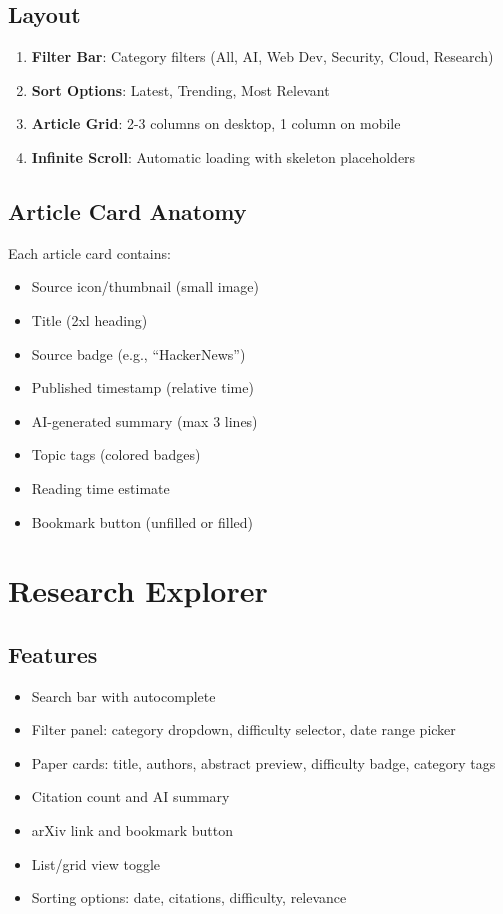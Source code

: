 \documentclass{report}
\begin{document}
\subsection{Layout}

\begin{enumerate}
    \item \textbf{Filter Bar}: Category filters (All, AI, Web Dev, Security, Cloud, Research)
    \item \textbf{Sort Options}: Latest, Trending, Most Relevant
    \item \textbf{Article Grid}: 2-3 columns on desktop, 1 column on mobile
    \item \textbf{Infinite Scroll}: Automatic loading with skeleton placeholders
\end{enumerate}

\subsection{Article Card Anatomy}

Each article card contains:
\begin{itemize}
    \item Source icon/thumbnail (small image)
    \item Title (2xl heading)
    \item Source badge (e.g., ``HackerNews'')
    \item Published timestamp (relative time)
    \item AI-generated summary (max 3 lines)
    \item Topic tags (colored badges)
    \item Reading time estimate
    \item Bookmark button (unfilled or filled)
\end{itemize}

\section{Research Explorer}

\subsection{Features}

\begin{itemize}
    \item Search bar with autocomplete
    \item Filter panel: category dropdown, difficulty selector, date range picker
    \item Paper cards: title, authors, abstract preview, difficulty badge, category tags
    \item Citation count and AI summary
    \item arXiv link and bookmark button
    \item List/grid view toggle
    \item Sorting options: date, citations, difficulty, relevance
\end{itemize}
\end{document}
